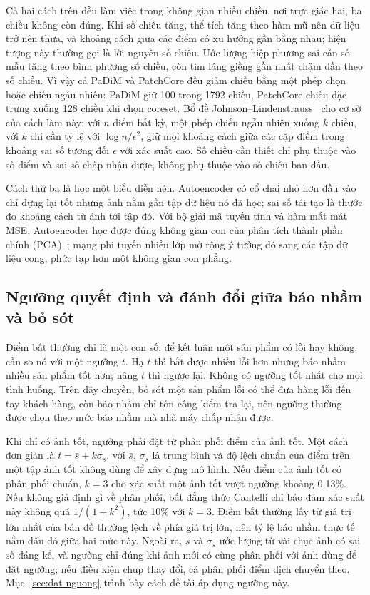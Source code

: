 Cả hai cách trên đều làm việc trong không gian nhiều chiều, nơi trực giác hai, ba chiều không còn đúng. Khi số chiều
tăng, thể tích tăng theo hàm mũ nên dữ liệu trở nên thưa, và khoảng cách giữa các điểm có xu hướng gần bằng nhau;
hiện tượng này thường gọi là lời nguyền số chiều. Ước lượng hiệp phương sai cần số mẫu tăng theo bình phương số
chiều, còn tìm láng giềng gần nhất chậm dần theo số chiều. Vì vậy cả PaDiM và PatchCore đều giảm chiều bằng một phép
chọn hoặc chiếu ngẫu nhiên: PaDiM giữ 100 trong 1792 chiều, PatchCore chiếu đặc trưng xuống 128 chiều khi chọn
coreset. Bổ đề Johnson--Lindenstrauss~\cite{johnsonExtensionsLipschitzMappings1984} cho cơ sở của cách làm này: với
$n$ điểm bất kỳ, một phép chiếu ngẫu nhiên xuống $k$ chiều, với $k$ chỉ cần tỷ lệ với $\log n / \epsilon^2$, giữ mọi
khoảng cách giữa các cặp điểm trong khoảng sai số tương đối $\epsilon$ với xác suất cao. Số chiều cần thiết chỉ phụ
thuộc vào số điểm và sai số chấp nhận được, không phụ thuộc vào số chiều ban đầu.

Cách thứ ba là học một biểu diễn nén. Autoencoder có cổ chai nhỏ hơn đầu vào chỉ dựng lại tốt những ảnh nằm gần tập
dữ liệu nó đã học; sai số tái tạo là thước đo khoảng cách từ ảnh tới tập đó. Với bộ giải mã tuyến tính và hàm mất mát
MSE, Autoencoder học được đúng không gian con của phân tích thành phần chính (PCA)~\cite{goodfellowDeepLearning2016};
mạng phi tuyến nhiều lớp mở rộng ý tưởng đó sang các tập dữ liệu cong, phức tạp hơn một không gian con phẳng.

\subsection{Ngưỡng quyết định và đánh đổi giữa báo nhầm và bỏ sót}

Điểm bất thường chỉ là một con số; để kết luận một sản phẩm có lỗi hay không, cần so nó với một ngưỡng $t$. Hạ $t$
thì bắt được nhiều lỗi hơn nhưng báo nhầm nhiều sản phẩm tốt hơn; nâng $t$ thì ngược lại. Không có ngưỡng tốt nhất
cho mọi tình huống. Trên dây chuyền, bỏ sót một sản phẩm lỗi có thể đưa hàng lỗi đến tay khách hàng, còn báo nhầm
chỉ tốn công kiểm tra lại, nên ngưỡng thường được chọn theo mức báo nhầm mà nhà máy chấp nhận được.

Khi chỉ có ảnh tốt, ngưỡng phải đặt từ phân phối điểm của ảnh tốt. Một cách đơn giản là $t = \bar{s} + k\sigma_s$,
với $\bar{s}$, $\sigma_s$ là trung bình và độ lệch chuẩn của điểm trên một tập ảnh tốt không dùng để xây dựng mô hình.
Nếu điểm của ảnh tốt có phân phối chuẩn, $k = 3$ cho xác suất một ảnh tốt vượt ngưỡng khoảng 0,13\%. Nếu không giả
định gì về phân phối, bất đẳng thức Cantelli chỉ bảo đảm xác suất này không quá $1/(1+k^2)$, tức 10\% với $k = 3$.
Điểm bất thường lấy từ giá trị lớn nhất của bản đồ thường lệch về phía giá trị lớn, nên tỷ lệ báo nhầm thực tế nằm
đâu đó giữa hai mức này. Ngoài ra, $\bar{s}$ và $\sigma_s$ ước lượng từ vài chục ảnh có sai số đáng kể, và ngưỡng
chỉ đúng khi ảnh mới có cùng phân phối với ảnh dùng để đặt ngưỡng; nếu điều kiện chụp thay đổi, cả phân phối điểm
dịch chuyển theo. Mục~\ref{sec:dat-nguong} trình bày cách đề tài áp dụng ngưỡng này.

